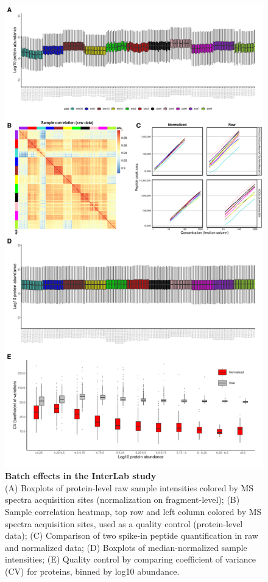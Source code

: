 \documentclass[num-refs]{wiley-article}
\begin{document}
\begin{figure}
	\centering
	\includegraphics[width=\textwidth,height=.9\textheight,keepaspectratio]{figures/Supp_InterLab.pdf}
	\caption{\textbf{Batch effects in the InterLab study}\\
		 \footnotesize  (A) Boxplots of protein-level raw sample intensities colored by MS spectra acquisition sites (normalization on fragment-level); (B) Sample correlation heatmap, top row and left column colored by MS spectra acquisition sites, used as a quality control (protein-level data); (C) Comparison of two spike-in peptide quantification in raw and normalized data; (D) Boxplots of median-normalized sample intensities; (E) Quality control by comparing coefficient of variance (CV) for proteins, binned by log10 abundance.}
	\label{fig:batch_figS1_InterLab}
\end{figure}
\end{document}

